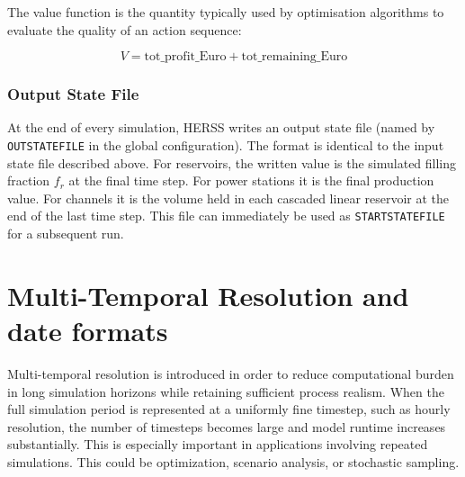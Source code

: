 \documentclass[a4paper, 12pt]{report}
\begin{document}
	The value function is the quantity typically used by optimisation algorithms to evaluate
	the quality of an action sequence:

	$$
	V = \text{tot\_profit\_Euro} + \text{tot\_remaining\_Euro}
	$$
	
	\subsubsection{Output State File}
	At the end of every simulation, HERSS writes an output state file (named by
	\texttt{OUTSTATEFILE} in the global configuration). The format is identical to the input
	state file described above. For reservoirs, the written value is the simulated filling
	fraction $f_r$ at the final time step. For power stations it is the final production
	value. For channels it is the volume held in each cascaded linear reservoir at the end of
	the last time step. This file can immediately be used as \texttt{STARTSTATEFILE} for a
	subsequent run.

	\section{Multi-Temporal Resolution and date formats}
	\label{sec:multitemp}

	Multi-temporal resolution is introduced in order to reduce computational 
	burden in long simulation horizons while retaining sufficient process realism. 
	When the full simulation period is represented at a uniformly fine timestep, such as hourly resolution, the number of timesteps becomes large and model runtime increases substantially. This is especially important in applications involving repeated simulations. This could be optimization, scenario analysis, or stochastic sampling.
	
\end{document}
